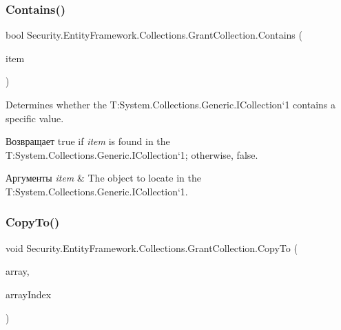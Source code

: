 \subsubsection{\texorpdfstring{Contains()}{Contains()}}
{\footnotesize\ttfamily bool Security.\+Entity\+Framework.\+Collections.\+Grant\+Collection.\+Contains (\begin{DoxyParamCaption}\item[{\hyperlink{interface_security_1_1_interfaces_1_1_model_1_1_i_grant}{I\+Grant}}]{item }\end{DoxyParamCaption})}



Determines whether the T\+:\+System.\+Collections.\+Generic.\+I\+Collection`1 contains a specific value. 

\begin{DoxyReturn}{Возвращает}
true if {\itshape item}  is found in the T\+:\+System.\+Collections.\+Generic.\+I\+Collection`1; otherwise, false. 
\end{DoxyReturn}

\begin{DoxyParams}{Аргументы}
{\em item} & The object to locate in the T\+:\+System.\+Collections.\+Generic.\+I\+Collection`1.\\
\hline
\end{DoxyParams}
\mbox{\label{class_security_1_1_entity_framework_1_1_collections_1_1_grant_collection_acb9fb91aac8d155a18c407f8f14dd99d}} 
\subsubsection{\texorpdfstring{Copy\+To()}{CopyTo()}}
{\footnotesize\ttfamily void Security.\+Entity\+Framework.\+Collections.\+Grant\+Collection.\+Copy\+To (\begin{DoxyParamCaption}\item[{\hyperlink{interface_security_1_1_interfaces_1_1_model_1_1_i_grant}{I\+Grant} \mbox{[}$\,$\mbox{]}}]{array,  }\item[{int}]{array\+Index }\end{DoxyParamCaption})}



